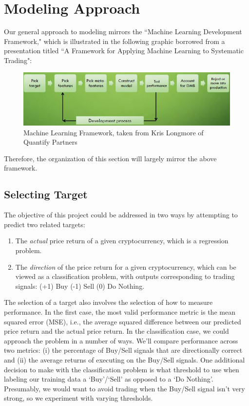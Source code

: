 \documentclass[12pt,twoside]{article}
\begin{document}
\section{Modeling Approach}

Our general approach to modeling mirrors the ``Machine Learning Development Framework," which is illustrated in the following graphic borrowed from a presentation titled ``A Framework for Applying Machine Learning to Systematic Trading":

\begin{figure}[H]
	\begin{center}
		\includegraphics[scale=1.0]{ml_framework_longmore}
		\caption{Machine Learning Framework, taken from Kris Longmore of Quantify Partners}
		\label{fig:ml_framework_longmore}
	\end{center}
\end{figure}

Therefore, the organization of this section will largely mirror the above framework.

\subsection{Selecting Target}

The objective of this project could be addressed in two ways by attempting to predict two related targets:
\begin{enumerate}
	\item The \textit{actual} price return of a given cryptocurrency, which is a regression problem.
	\item The \textit{direction} of the price return for a given cryptocurrency, which can be viewed as a classification problem, with outputs corresponding to trading signals: (+1) Buy (-1) Sell (0) Do Nothing.
\end{enumerate} 

The selection of a target also involves the selection of how to measure performance. In the first case, the most valid performance metric is the mean squared error (MSE), i.e., the average squared difference between our predicted price return and the actual price return. In the classification case, we could approach the problem in a number of ways. We'll compare performance across two metrics: (i) the percentage of Buy/Sell signals that are directionally correct and (ii) the average returns of executing on the Buy/Sell signals. One additional decision to make with the classification problem is what threshold to use when labeling our training data a `Buy'/`Sell' as opposed to a `Do Nothing'. Presumably, we would want to avoid trading when the Buy/Sell signal isn't very strong, so we experiment with varying thresholds.
\end{document}
